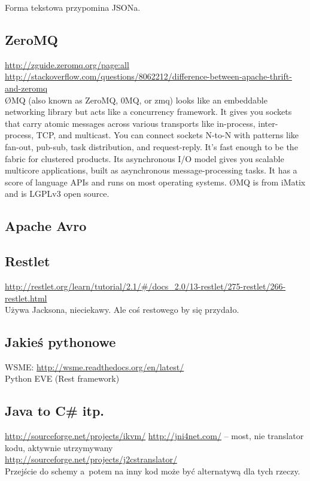 Forma tekstowa przypomina JSONa.

\subsection{ZeroMQ}
\url{http://zguide.zeromq.org/page:all}
\url{http://stackoverflow.com/questions/8062212/difference-between-apache-thrift-and-zeromq}\\
ØMQ (also known as ZeroMQ, 0MQ, or zmq) looks like an embeddable networking library but acts like a concurrency framework. It gives you sockets that carry atomic messages across various transports like in-process, inter-process, TCP, and multicast. You can connect sockets N-to-N with patterns like fan-out, pub-sub, task distribution, and request-reply. It's fast enough to be the fabric for clustered products. Its asynchronous I/O model gives you scalable multicore applications, built as asynchronous message-processing tasks. It has a score of language APIs and runs on most operating systems. ØMQ is from iMatix and is LGPLv3 open source.

\subsection{Apache Avro}

\subsection{Restlet}
\url{http://restlet.org/learn/tutorial/2.1/#/docs_2.0/13-restlet/275-restlet/266-restlet.html}\\
Używa Jacksona, nieciekawy. Ale coś restowego by się przydało.

\subsection{Jakieś pythonowe}
WSME: \url{http://wsme.readthedocs.org/en/latest/}\\
Python EVE (Rest framework)\\

\subsection{Java to C\# itp.}
\url{http://sourceforge.net/projects/ikvm/}
\url{http://jni4net.com/} -- most, nie translator kodu, aktywnie utrzymywany \\
\url{http://sourceforge.net/projects/j2cstranslator/}\\
Przejście do schemy a~potem na inny kod może być alternatywą dla tych rzeczy.

